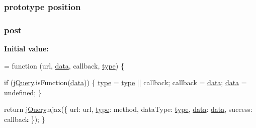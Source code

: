 \subsubsection[{\texorpdfstring{position}{position}}]{ {\bf prototype} position}\hypertarget{jquery-2_82_81-vsdoc_8js_a0a2a38b3281bb5c9cf0c479a04b513cb}{}\label{jquery-2_82_81-vsdoc_8js_a0a2a38b3281bb5c9cf0c479a04b513cb}
\subsubsection[{\texorpdfstring{post}{post}}]{ post}\hypertarget{jquery-2_82_81-vsdoc_8js_ab2cf0610f8e671450cfe070adfd73a8a}{}\label{jquery-2_82_81-vsdoc_8js_ab2cf0610f8e671450cfe070adfd73a8a}
{\bfseries Initial value\+:}
\begin{DoxyCode}
= \textcolor{keyword}{function} (url, \hyperlink{jquery-2_82_81-vsdoc_8js_a609407b3456fdc3c5671a9fc4a226ff7}{data}, callback, \hyperlink{jquery-2_82_81-vsdoc_8js_a3940565e83a9bfd10d95ffd27536da91}{type}) \{
        

        
        \textcolor{keywordflow}{if} (\hyperlink{jquery-2_82_81-vsdoc_8js_add5237586d970a38a81f990e8eb28c6c}{jQuery}.isFunction(\hyperlink{jquery-2_82_81-vsdoc_8js_a609407b3456fdc3c5671a9fc4a226ff7}{data})) \{
            \hyperlink{jquery-2_82_81-vsdoc_8js_a3940565e83a9bfd10d95ffd27536da91}{type} = \hyperlink{jquery-2_82_81-vsdoc_8js_a3940565e83a9bfd10d95ffd27536da91}{type} || callback;
            callback = \hyperlink{jquery-2_82_81-vsdoc_8js_a609407b3456fdc3c5671a9fc4a226ff7}{data};
            \hyperlink{jquery-2_82_81-vsdoc_8js_a609407b3456fdc3c5671a9fc4a226ff7}{data} = \hyperlink{jquery-2_82_81-vsdoc_8js_a08113a236cc18d2a9d5ce27e638012be}{undefined};
        \}

        \textcolor{keywordflow}{return} \hyperlink{jquery-2_82_81-vsdoc_8js_add5237586d970a38a81f990e8eb28c6c}{jQuery}.ajax(\{
            url: url,
            \hyperlink{jquery-2_82_81-vsdoc_8js_a3940565e83a9bfd10d95ffd27536da91}{type}: method,
            dataType: \hyperlink{jquery-2_82_81-vsdoc_8js_a3940565e83a9bfd10d95ffd27536da91}{type},
            \hyperlink{jquery-2_82_81-vsdoc_8js_a609407b3456fdc3c5671a9fc4a226ff7}{data}: \hyperlink{jquery-2_82_81-vsdoc_8js_a609407b3456fdc3c5671a9fc4a226ff7}{data},
            success: callback
        \});
    \}
\end{DoxyCode}

